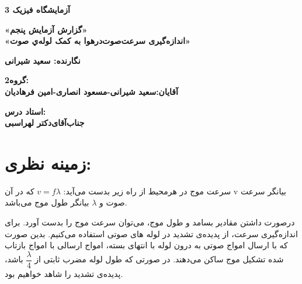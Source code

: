 \documentclass{article}
\begin{document}
\begin{titlepage}
	\begin{center}
		\vspace*{1cm}
		
		\textbf{آزمایشگاه فیزیک 3}
		
		\vspace{0.5cm}
		\textbf{«گزارش آزمایش پنجم»}\\
		\textbf {«اندازه‌گیری سرعت‌صوت‌درهوا به کمک لوله‌ي صوت»}
		
		\vspace{1.5cm}
		
		\textbf{نگارنده: سعید شیرانی}
		
		\vspace{2cm}
		
		\textbf{گروه2:}\\
		\textbf{آقایان:سعید شیرانی-مسعود انصاری-امین فرهادیان}
		
		\vspace{0.8cm}
		\textbf{استاد درس:}\\
		\textbf{ جناب‌آقای‌دکتر لهراسبی}

		
	\end{center}
\end{titlepage}











\author{نگارنده: سعید شیرانی} 
\vspace{0.5cm}
\vspace{1.5cm}
\newpage{}
\normalsize 




\section{زمینه نظری:}
سرعت موج در هرمحیط از راه زیر بدست می‌آید:    
$v = f \lambda$
که در آن v بیانگر سرعت صوت و $\lambda$ بیانگر طول موج می‌باشد.

درصورت داشتن مقادیر بسامد و طول موج، می‌توان سرعت موج را بدست آورد. 
برای اندازه‌گیری سرعت، از پدیده‌ی تشدید در لوله های صوتی استفاده می‌کنیم. بدین صورت که با ارسال امواج صوتی به درون لوله با انتهای بسته، امواج ارسالی با امواج بازتاب شده تشکیل موج ساکن می‌دهند. در صورتی که طول لوله مضرب ثابتی از $\dfrac{\lambda}{4}$ باشد، پدیده‌ی تشدید را شاهد خواهیم بود.
\end{document}
